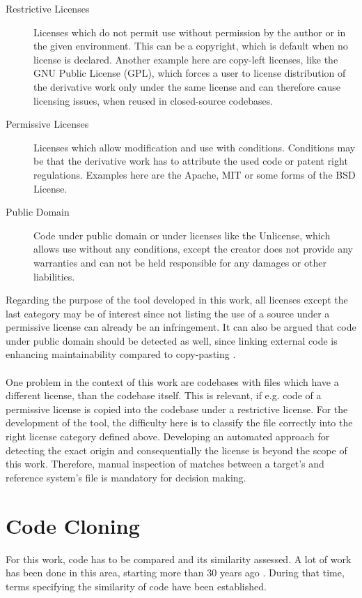 \begin{description}
	\item[Restrictive Licenses] Licenses which do not permit use without permission by the author or in the given environment.
		This can be a copyright, which is default when no license is declared.
		Another example here are copy-left licenses, like the GNU Public License (GPL), which forces a user to license distribution of the derivative work only under the same license and can therefore cause licensing issues, when reused in closed-source codebases.
	\item[Permissive Licenses]
		Licenses which allow modification and use with conditions.
		Conditions may be that the derivative work has to attribute the used code or patent right regulations.
		Examples here are the Apache, MIT or some forms of the BSD License.
	\item[Public Domain] 
		Code under public domain or under licenses like the Unlicense, which allows use without any conditions, except the creator does not provide any warranties and can not be held responsible for any damages or other liabilities.
\end{description}

Regarding the purpose of the tool developed in this work, all licenses except the last category may be of interest since not listing the use of a source under a permissive license can already be an infringement.
It can also be argued that code under public domain should be detected as well, since linking external code is enhancing maintainability compared to copy-pasting \cite{heinemann2012effective}.
\\ \\
\noindent
One problem in the context of this work are codebases with files which have a different license, than the codebase itself.
This is relevant, if e.g. code of a permissive license is copied into the codebase under a restrictive license.
For the development of the tool, the difficulty here is to classify the file correctly into the right license category defined above.
Developing an automated approach for detecting the exact origin and consequentially the license is beyond the scope of this work.
Therefore, manual inspection of matches between a target's and reference system's file is mandatory for decision making.

\section{Code Cloning}\label{section:preliminaries/code_cloning}
For this work, code has to be compared and its similarity assessed.
A lot of work has been done in this area, starting more than 30 years ago \cite{lancaster2004comparison}.
During that time, terms specifying the similarity of code have been established.

